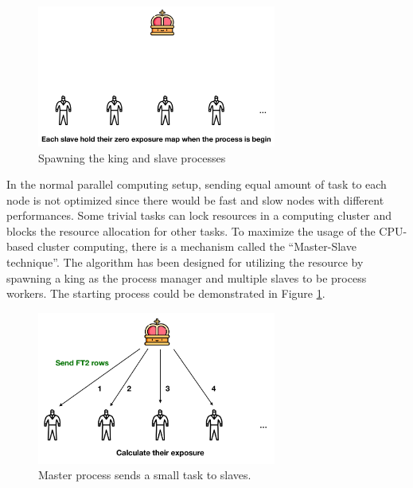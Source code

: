 \begin{figure}[h!]
    \centering
    \includegraphics[width=0.7\textwidth]{content/methodology/figures/ms1_v2}
    \caption{Spawning the king and slave processes}
    \label{fig:ms1}
\end{figure}

In the normal parallel computing setup, sending equal
amount of task to each node is not optimized since
there would be fast and slow nodes with different performances. 
Some trivial tasks can lock resources in a
computing cluster and blocks the resource
allocation for other tasks. 
To maximize the usage of the CPU-based cluster computing, there is a 
mechanism called the ``Master-Slave technique''. The algorithm has been designed for utilizing the resource by spawning a king as the process manager 
and multiple slaves to be process workers. The starting process could 
be demonstrated in Figure \ref{fig:ms1}. 


\begin{figure}[h!]
    \centering
    \includegraphics[width=0.7\textwidth]{content/methodology/figures/ms2}
    \caption{Master process sends a small task to slaves.}
    \label{fig:ms2}
\end{figure}


